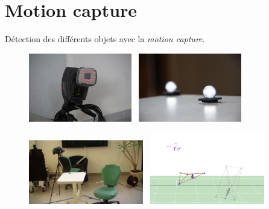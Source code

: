 \documentclass{beamer}
\begin{document}
\section{Motion capture}
\begin{frame}
  \center Détection des différents objets avec la \textit{motion capture}.\\
   \begin{figure}
    \includegraphics[width=4.5cm]{./images/IR.jpg}~
    \includegraphics[width=4.5cm]{./images/marker_flash.jpg}
  \end{figure}
  \vspace{-5mm}
  \begin{figure}
    \includegraphics[width=5cm]{./images/mocap_real.jpg}~
    \includegraphics[width=5cm]{./images/mocap.png}
  \end{figure}
\end{frame}
\end{document}
